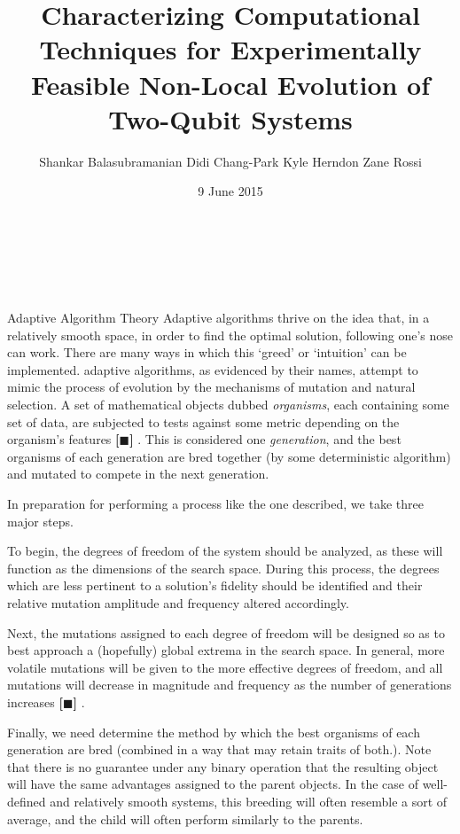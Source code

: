 \documentclass[12pt]{beamer}
\title{Characterizing Computational Techniques for Experimentally Feasible Non-Local Evolution of Two-Qubit Systems}
\author{Shankar Balasubramanian\hspace{1em} Didi Chang-Park\hspace{1em} Kyle Herndon\hspace{1em} Zane Rossi}
\institute{TJHSST Modern Physics and Optics Lab}
\date{9 June 2015}
\newcommand{\cit}{\textbf{[$\blacksquare$] }}
\renewcommand{\maketitle}{%
	\begin{center}%
		\Huge\inserttitle\\[5mm]%
		\Large\insertauthor\\[5mm]%
		\Large\insertinstitute%
	\end{center}%
	\vspace*{-1ex}%
}
\begin{document}
\centering
	\begin{frame}{\maketitle}
		\begin{columns}
			\begin{column}{.45\textwidth}
				\begin{exampleblock}{Adaptive Algorithm Theory}
	Adaptive algorithms thrive on the idea that, in a relatively smooth space, in order to find the optimal solution, following one's nose can work. There are many ways in which this `greed' or `intuition' can be implemented. adaptive algorithms, as evidenced by their names, attempt to mimic the process of evolution by the mechanisms of mutation and natural selection. A set of mathematical objects dubbed \emph{organisms}, each containing some set of data, are subjected to tests against some metric depending on the organism's features \cit. This is considered one \emph{generation}, and the best organisms of each generation are bred together (by some deterministic algorithm) and mutated to compete in the next generation.

	In preparation for performing a process like the one described, we take three major steps.
	
	To begin, the degrees of freedom of the system should be analyzed, as these will function as the dimensions of the search space. During this process, the degrees which are less pertinent to a solution's fidelity should be identified and their relative mutation amplitude and frequency altered accordingly.

	Next, the mutations assigned to each degree of freedom will be designed so as to best approach a (hopefully) global extrema in the search space. In general, more volatile mutations will be given to the more effective degrees of freedom, and all mutations will decrease in magnitude and frequency as the number of generations increases \cit. 

	Finally, we need determine the method by which the best organisms of each generation are bred (combined in a way that may retain traits of both.). Note that there is no guarantee under any binary operation that the resulting object will have the same advantages assigned to the parent objects. In the case of well-defined and relatively smooth systems, this breeding will often resemble a sort of average, and the child will often perform similarly to the parents. 


\end{exampleblock}
\end{column}
\end{columns}
\end{frame}
\end{document}
